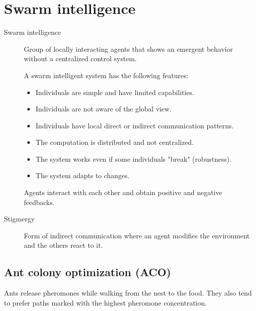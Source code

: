 \chapter{Swarm intelligence}

\begin{description}
    \item[Swarm intelligence] 
        Group of locally interacting agents that 
        shows an emergent behavior without a centralized control system.

        A swarm intelligent system has the following features:
        \begin{itemize}
            \item Individuals are simple and have limited capabilities.
            \item Individuals are not aware of the global view.
            \item Individuals have local direct or indirect communication patterns.
            \item The computation is distributed and not centralized.
            \item The system works even if some individuals "break" (robustness).
            \item The system adapts to changes.
        \end{itemize}

        Agents interact with each other and obtain positive and negative feedbacks.

    \item[Stigmergy] 
        Form of indirect communication where an agent modifies the environment and the others react to it.
\end{description}



\section{Ant colony optimization (ACO)}


Ants release pheromones while walking from the nest to the food.
They also tend to prefer paths marked with the highest pheromone concentration.

